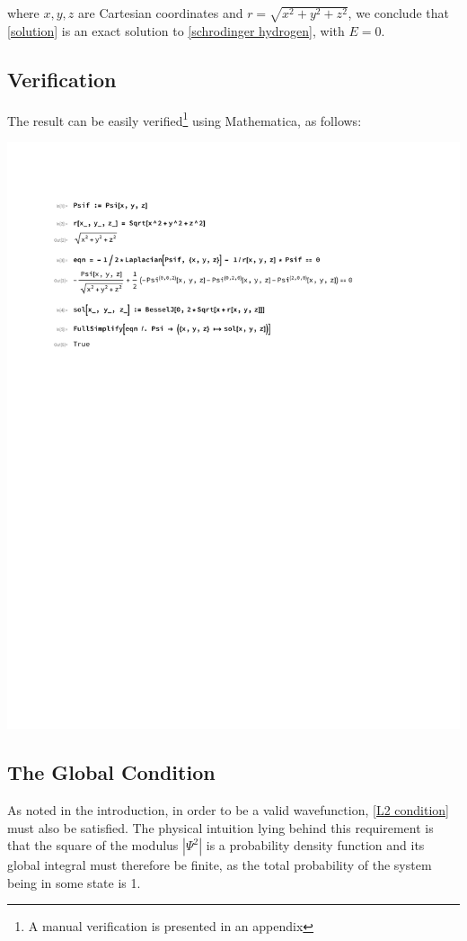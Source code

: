 \documentclass{article}
\begin{document}
where $x,y,z$ are Cartesian coordinates and $r=\sqrt{x^2+y^2+z^2}$, we conclude that
\eqref{solution} is an exact solution to \eqref{schrodinger hydrogen}, with $E=0$.

\subsection*{Verification}

\label{verification}
The result can be easily verified\footnote{A manual verification is presented in an appendix} using Mathematica, as follows:

\includegraphics[page=1, clip, trim=1in 7in 1in 1in, width=\textwidth]{improved.pdf}

\subsection*{The Global Condition}

As noted in the introduction, in order to be a valid wavefunction, \eqref{L2 condition} must also be satisfied.
The physical intuition lying behind this requirement is that the square of the modulus $|\Psi^2|$ is a probability
density function and its global integral must therefore be finite, as the total probability of the system
being in some state is 1.
\end{document}
